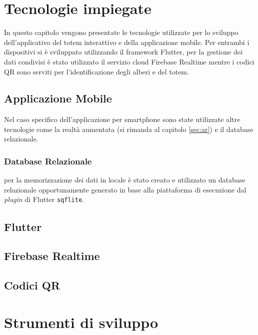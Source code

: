 \section{Tecnologie impiegate}
In questo capitolo vengono presentate le tecnologie utilizzate per lo sviluppo dell'applicativo del totem interattivo e della applicazione mobile. Per entrambi i dispositivi si è sviluppato utilizzando il framework Flutter, per la gestione dei dati condivisi è stato utilizzato il servizio cloud Firebase Realtime mentre i codici QR sono serviti per l'identificazione degli alberi e del totem.

\subsection{Applicazione Mobile}
Nel caso specifico dell'applicazione per smartphone sono state utilizzate altre tecnologie come la realtà aumentata (si rimanda al capitolo \ref{sec:ar}) e il database relazionale.
\subsubsection{Database Relazionale}
per la memorizzazione dei dati in locale è stato creato e utilizzato un database relazionale opportunamente generato in base alla piattaforma di esecuzione dal \textit{plugin} di Flutter \texttt{sqflite}.
\subsection{Flutter}

%
\subsection{Firebase Realtime}

%
\subsection{Codici QR}

%
\section{Strumenti di sviluppo}

